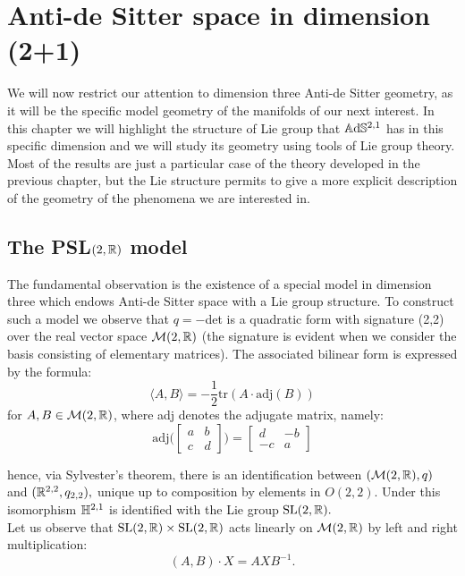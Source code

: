 \chapter{Anti-de Sitter space in dimension (2+1)}
We will now restrict our attention to dimension three Anti-de Sitter geometry, as it will be the specific model geometry of the manifolds of our next interest. In this chapter we will highlight the structure of Lie group that $\mathbb{A}\mathrm{d}\mathbb{S}^{2,1}$ has in this specific dimension and we will study its geometry using tools of Lie group theory. Most of the results are just a particular case of the theory developed in the previous chapter, but the Lie structure permits to give a more explicit description of the geometry of the phenomena we are interested in.\\

\section{The {PSL}$(2,\mathbb{R})$ model} 
The fundamental observation is the existence of a special model in dimension three which endows Anti-de Sitter space with a Lie group structure. To construct such a model we observe that $q=-$det is a quadratic form with signature (2,2) over the real vector space $\mathcal{M}(2,\mathbb{R})$ (the signature is evident when we consider the basis consisting of elementary matrices). The associated bilinear form is expressed by the formula:
\begin{equation}\label{quadratic}
    \langle A,B\rangle=-\frac{1}{2}\text{tr}(A\cdot\text{adj}(B))
\end{equation}
for $A,B\in\mathcal{M}(2,\mathbb{R})$, where adj denotes the adjugate matrix, namely: 
\[
    \text{adj}\Big(\begin{bmatrix}
        a & b \\
        c & d
    \end{bmatrix}\Big) = \begin{bmatrix}
        d & -b \\
        -c & a
    \end{bmatrix}
\]

hence, via Sylvester's theorem, there is an identification between $(\mathcal{M}(2,\mathbb{R}),q)$ and $(\mathbb{R}^{2,2}, q_{2,2}),$ unique up to composition by elements in $O(2,2)$. Under this isomorphism $\mathbb{H}^{2,1}$ is identified with the Lie group $\text{SL}(2,\mathbb{R}).$\\
Let us observe that $\text{SL}(2,\mathbb{R})\times \text{SL}(2,\mathbb{R})$ acts linearly on $\mathcal{M}(2,\mathbb{R})$ by left and right multiplication:
$$(A,B)\cdot X=AXB^{-1}.$$


